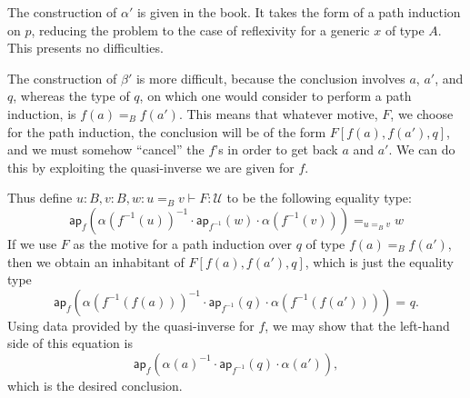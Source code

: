 \documentclass{article}
\newcommand{\idty}[3]{{#2}\mathbin{=_{#1}}{#3}}
\newcommand{\app}[2]{{#1}({#2})}
\newcommand{\apppath}[1]{\mathsf{ap}_{#1}}
\newcommand{\univty}{\mathcal{U}}
\newcommand{\inverse}[1]{#1^{-1}}
\newcommand{\concat}[2]{{#1}\cdot{#2}}
\begin{document}
The construction of $\alpha'$ is given in the book.  It takes the form of a path induction on $p$, reducing the problem to the case of reflexivity for a generic $x$ of type $A$.  This presents no difficulties.

The construction of $\beta'$ is more difficult, because the conclusion involves $a$, $a'$, and $q$, whereas the type of $q$, on which one would consider to perform a path induction, is $\idty{B}{\app{f}{a}}{\app{f}{a'}}$.  This means that whatever motive, $F$, we choose for the path induction, the conclusion will be of the form $F[\app{f}{a},\app{f}{a'},q]$, and we must somehow ``cancel'' the $f$'s in order to get back $a$ and $a'$.  We can do this by exploiting the quasi-inverse we are given for $f$.

Thus define $u:B,v:B,w:\idty{B}{u}{v}\vdash F:\univty$ to be the following equality type:
\begin{displaymath}
  \idty{\idty{B}{u}{v}}{\app{\apppath{f}}{\concat{\concat{\inverse{\app{\alpha}{\app{\inverse{f}}{u}}}}{\app{\apppath{\inverse{f}}}{w}}}{\app{\alpha}{\app{\inverse{f}}{v}}}}}{w}
\end{displaymath}
If we use $F$ as the motive for a path induction over $q$ of type
$\idty{B}{\app{f}{a}}{\app{f}{a'}}$, then we obtain an inhabitant of
${F[\app{f}{a},\app{f}{a'},q]}$, which is just the equality type
\begin{displaymath}
  \idty{}
  {\app{\apppath{f}}{\concat{\concat{\inverse{\app{\alpha}{\app{\inverse{f}}{\app{f}{a}}}}}{\app{\apppath{\inverse{f}}}{q}}}{\app{\alpha}{\app{\inverse{f}}{\app{f}{a'}}}}}}
  {q}.
\end{displaymath}
Using data provided by the quasi-inverse for $f$, we may show that the left-hand side of this equation is
\begin{displaymath}
  \app{\apppath{f}}{\concat{\concat{\inverse{\app{\alpha}{a}}}{\app{\apppath{\inverse{f}}}{q}}}{\app{\alpha}{a'}}},
\end{displaymath}
which is the desired conclusion.
\end{document}
